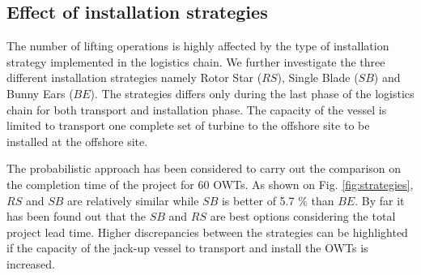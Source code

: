 \subsection{Effect of installation strategies}
The number of lifting operations is highly affected by the type of installation strategy implemented in the logistics chain. We further investigate the three different installation strategies namely Rotor Star ($RS$), Single Blade ($SB$) and Bunny Ears ($BE$). The strategies differs only during the last phase of the logistics chain for both transport and installation phase. The capacity of the vessel is limited to transport one complete set of turbine to the offshore site to be installed at the offshore site.

The probabilistic approach has been considered to carry out the comparison on the completion time of the project for 60 OWTs. As shown on Fig. \ref{fig:strategies}, $RS$ and $SB$ are relatively similar while $SB$ is better of 5.7 \% than $BE$. By far it has been found out that the $SB$ and $RS$ are best options considering the total project lead time. Higher discrepancies between the strategies can be highlighted if the capacity of the jack-up vessel to transport and install the OWTs is increased.%